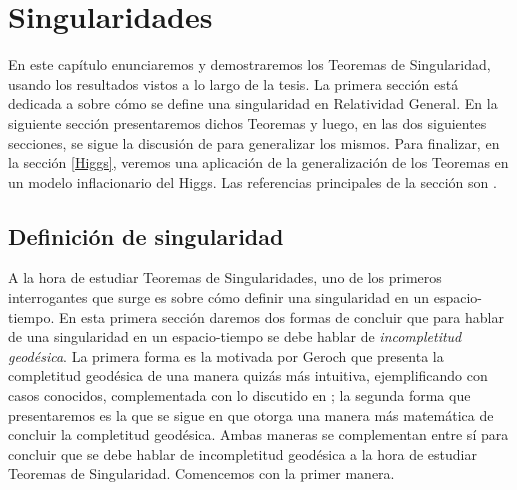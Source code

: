 ﻿\chapter{Singularidades}\label{sing}



En este capítulo enunciaremos y demostraremos los Teoremas de Singularidad, usando los resultados vistos a lo largo de la tesis. La primera sección está dedicada a sobre cómo se define una singularidad en Relatividad General. En la siguiente sección presentaremos dichos Teoremas y luego, en las dos siguientes secciones, se sigue la discusión de \citep{2011CQGra..28l5009F} para generalizar los mismos. Para finalizar, en la sección \ref{Higgs}, veremos una aplicación de la generalización de los Teoremas en un modelo inflacionario del Higgs. Las referencias principales de la sección son \citep{1968AnPhy..48..526G,2006physics...5007S,1984ucp..book.....W,1975lsss.book.....H,Penrose}.





\section{Definición de singularidad}


A la hora de estudiar Teoremas de Singularidades, uno de los primeros interrogantes que surge es sobre cómo definir una singularidad en un espacio-tiempo. En esta primera sección daremos dos formas de concluir que para hablar de una singularidad en un espacio-tiempo se debe hablar de \textit{incompletitud geodésica}. La primera forma es la motivada por Geroch \citep{1968AnPhy..48..526G} que presenta la completitud geodésica de una manera quizás más intuitiva, ejemplificando con casos conocidos, complementada con lo discutido en \citep{2006physics...5007S}; la segunda forma que presentaremos es la que se sigue en \citep{1975lsss.book.....H} que otorga una manera más matemática de concluir la completitud geodésica. Ambas maneras se complementan entre sí para concluir que se debe hablar de incompletitud geodésica a la hora de estudiar Teoremas de Singularidad. Comencemos con la primer manera.

